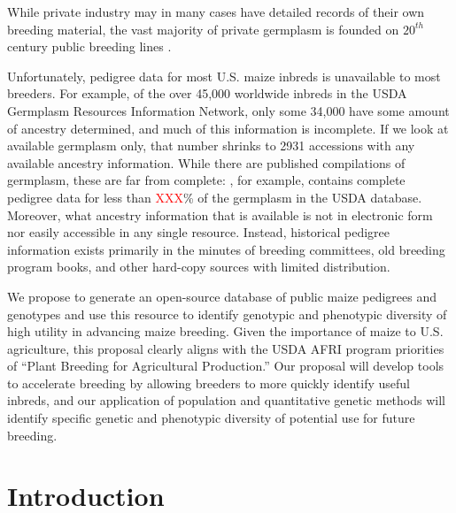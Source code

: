 \documentclass[draft,12pt]{article}
\begin{document}
While private industry may in many cases have detailed records of their own breeding material, the vast majority of private germplasm is founded on $20^{th}$ century public breeding lines \citep{nelson2008molecular}.

Unfortunately, pedigree data for most U.S. maize inbreds is unavailable to most breeders. 
For example, of the over 45,000 worldwide inbreds in the USDA Germplasm Resources Information Network, only some 34,000 have some amount of ancestry determined, and much of this information is incomplete.
If we look at available germplasm only, that number shrinks to 2931 accessions with any available ancestry information.
While there are published compilations of germplasm, these are far from complete:  \citet{gerdes1993compilation}, for example, contains complete pedigree data for less than \textcolor{red}{XXX}\% of the germplasm in the USDA database.
Moreover, what ancestry information that is available is not in electronic form nor easily accessible in any single resource.  
Instead, historical pedigree information exists primarily in the minutes of breeding committees, old breeding program books, and other hard-copy sources with limited distribution.  

{We propose to  generate an open-source database of public maize pedigrees and genotypes and use this resource to identify genotypic and phenotypic diversity of high utility in advancing maize breeding.}
Given the importance of maize to U.S. agriculture, this proposal clearly aligns with the USDA AFRI program priorities of ``Plant Breeding for Agricultural Production.''  
Our proposal will develop tools to accelerate breeding by allowing breeders to more quickly identify useful inbreds, and our application of population and quantitative genetic methods will identify specific genetic and phenotypic diversity of potential use for future breeding.  

\section*{Introduction}
\label{sec:introduction}

\end{document}
